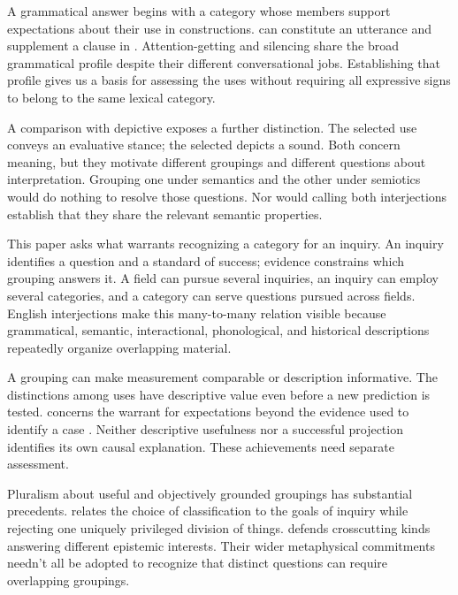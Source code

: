 \documentclass[12pt]{article}
\begin{document}
A grammatical answer begins with a category whose members support
expectations about their use in constructions.  can
constitute an utterance and supplement a clause in . Attention-getting  and silencing  share
the broad grammatical profile despite their different conversational
jobs. Establishing that profile gives us a basis for assessing the
 uses without requiring all expressive signs to belong
to the same lexical category.

A comparison with depictive  exposes a further distinction.
The selected  use conveys an evaluative stance; the selected
 depicts a sound. Both concern meaning, but they motivate
different groupings and different questions about interpretation. Grouping
one under semantics and the other under semiotics would do nothing to
resolve those questions. Nor would calling both interjections establish
that they share the relevant semantic properties.

This paper asks what warrants recognizing a category for an inquiry.
An inquiry identifies a question and a standard of success; evidence
constrains which grouping answers it. A field can pursue several inquiries,
an inquiry can employ several categories, and a category can serve questions
pursued across fields. English interjections make this many-to-many relation
visible because grammatical, semantic, interactional, phonological, and
historical descriptions repeatedly organize overlapping material.

A grouping can make measurement comparable or description informative.
The distinctions among  uses have descriptive value even
before a new prediction is tested.  concerns the
warrant for expectations beyond the evidence used to identify a case
\citep{Goodman1955}. Neither descriptive usefulness nor a successful
projection identifies its own causal explanation. These achievements
need separate assessment.

Pluralism about useful and objectively grounded groupings has substantial
precedents. \textcite[5--7, 17--18]{dupre1993disorder} relates the choice of
classification to the goals of inquiry while rejecting one uniquely
privileged division of things. \textcite[63--64, 69--72]{khalidi2013}
defends crosscutting kinds answering different epistemic interests.
Their wider metaphysical commitments needn't all be adopted to recognize
that distinct questions can require overlapping groupings.
\end{document}
